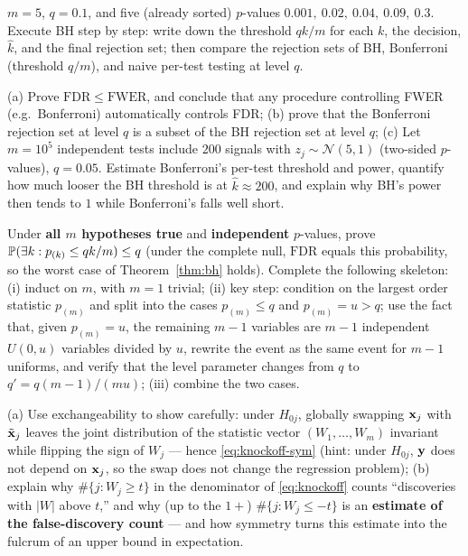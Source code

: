 \begin{exercise}\label{ex:bh-hand}
$m = 5$, $q = 0.1$, and five (already sorted) $p$-values $0.001,\ 0.02,\ 0.04,\ 0.09,\ 0.3$. Execute BH step by step: write down the threshold $qk/m$ for each $k$, the decision, $\hat{k}$, and the final rejection set; then compare the rejection sets of BH, Bonferroni (threshold $q/m$), and naive per-test testing at level $q$.
\end{exercise}

\begin{exercise}\label{ex:bh-bonf}
(a) Prove $\mathrm{FDR} \le \mathrm{FWER}$, and conclude that any procedure controlling FWER (e.g.\ Bonferroni) automatically controls FDR; (b) prove that the Bonferroni rejection set at level $q$ is a subset of the BH rejection set at level $q$; (c) Let $m = 10^5$ independent tests include $200$ signals with $z_j \sim \mathcal{N}(5, 1)$ (two-sided $p$-values), $q = 0.05$. Estimate Bonferroni's per-test threshold and power, quantify how much looser the BH threshold is at $\hat{k} \approx 200$, and explain why BH's power then tends to $1$ while Bonferroni's falls well short.
\end{exercise}

\begin{exercise}\label{ex:bh-proof}
Under \textbf{all $m$ hypotheses true} and \textbf{independent} $p$-values, prove $\mathbb{P}( \exists k : p_{(k)} \le qk/m ) \le q$ (under the complete null, $\mathrm{FDR}$ equals this probability, so the worst case of Theorem~\ref{thm:bh} holds). Complete the following skeleton: (i) induct on $m$, with $m = 1$ trivial; (ii) key step: condition on the largest order statistic $p_{(m)}$ and split into the cases $p_{(m)} \le q$ and $p_{(m)} = u > q$; use the fact that, given $p_{(m)} = u$, the remaining $m-1$ variables are $m-1$ independent $U(0, u)$ variables divided by $u$, rewrite the event as the same event for $m-1$ uniforms, and verify that the level parameter changes from $q$ to $q' = q(m-1)/(m u)$; (iii) combine the two cases.
\end{exercise}

\begin{exercise}\label{ex:knockoff}
(a) Use exchangeability to show carefully: under $H_{0j}$, globally swapping $\mathbf{x}_j$ with $\tilde{\mathbf{x}}_j$ leaves the joint distribution of the statistic vector $(W_1, \dots, W_m)$ invariant while flipping the sign of $W_j$ — hence \eqref{eq:knockoff-sym} (hint: under $H_{0j}$, $\mathbf{y}$ does not depend on $\mathbf{x}_j$, so the swap does not change the regression problem); (b) explain why $\#\{j : W_j \ge t\}$ in the denominator of \eqref{eq:knockoff} counts ``discoveries with $|W|$ above $t$,'' and why (up to the $1+$) $\#\{j : W_j \le -t\}$ is an \textbf{estimate of the false-discovery count} — and how symmetry turns this estimate into the fulcrum of an upper bound in expectation.
\end{exercise}
